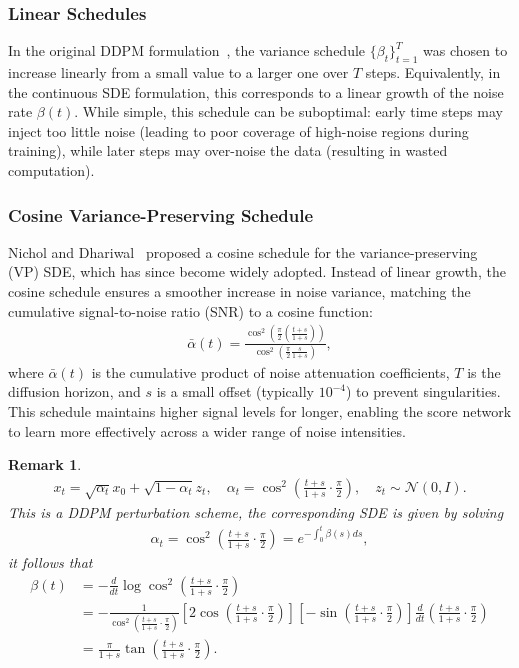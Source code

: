 \documentclass[a4paper,12pt]{article}
\newtheorem{remark}{Remark}[section]
\begin{document}
\subsubsection*{Linear Schedules}

In the original DDPM formulation~\cite{hoDenoisingDiffusionProbabilistic2020}, the variance schedule \(\{\beta_t\}_{t=1}^T\) was chosen to increase linearly from a small value to a larger one over \(T\) steps. 
Equivalently, in the continuous SDE formulation, this corresponds to a linear growth of the noise rate \(\beta(t)\). While simple, this schedule can be suboptimal: early time steps may inject too little noise (leading to poor coverage of high-noise regions during training), while later steps may over-noise the data (resulting in wasted computation). 

\subsubsection*{Cosine Variance-Preserving Schedule}
Nichol and Dhariwal~\cite{nicholImprovedDenoisingDiffusion2021} proposed a cosine schedule for the variance-preserving (VP) SDE, which has since become widely adopted. 
Instead of linear growth, the cosine schedule ensures a smoother increase in noise variance, matching the cumulative signal-to-noise ratio (SNR) to a cosine function:
\begin{align*}
    \bar \alpha(t) = \frac{\cos^2\!\left(\frac{\pi}{2}(\frac{t+s}{1+s})\right)}{\cos^2\!\left(\frac{\pi}{2}\frac{s}{1+s}\right)},
\end{align*}
where \(\bar \alpha(t)\) is the cumulative product of noise attenuation coefficients, \(T\) is the diffusion horizon, and \(s\) is a small offset (typically \(10^{-4}\)) to prevent singularities. This schedule maintains higher signal levels for longer, enabling the score network to learn more effectively across a wider range of noise intensities.
\begin{remark}
    \begin{align*}
        x_t=\sqrt{\alpha_t}x_0+\sqrt{1-\alpha_t}z_t,\quad\alpha_t=\cos^2\left(\frac{t+s}{1+s}\cdot\frac{\pi}{2}\right),\quad z_t\sim\mathcal{N}\left(0, I\right).
    \end{align*}
    This is a DDPM perturbation scheme, the corresponding SDE is given by solving
    \begin{align*}
        \alpha_t=\cos^2\left(\frac{t+s}{1+s}\cdot\frac{\pi}{2}\right)=e^{-\int_0^t\beta(s)ds},
    \end{align*}
    it follows that
    \begin{align*}
        \beta(t)
        &=-\frac{d}{dt}\log\cos^2\left(\frac{t+s}{1+s}\cdot\frac{\pi}{2}\right)\\
        &=-\frac{1}{\cos^2\left(\frac{t+s}{1+s}\cdot\frac{\pi}{2}\right)}\left[2\cos\left(\frac{t+s}{1+s}\cdot\frac{\pi}{2}\right)\right]\left[-\sin\left(\frac{t+s}{1+s}\cdot\frac{\pi}{2}\right)\right]\frac{d}{dt}\left(\frac{t+s}{1+s}\cdot\frac{\pi}{2}\right)\\
        &=\frac{\pi}{1+s}\tan\left(\frac{t+s}{1+s}\cdot\frac{\pi}{2}\right).
    \end{align*}
\end{remark}
\end{document}
